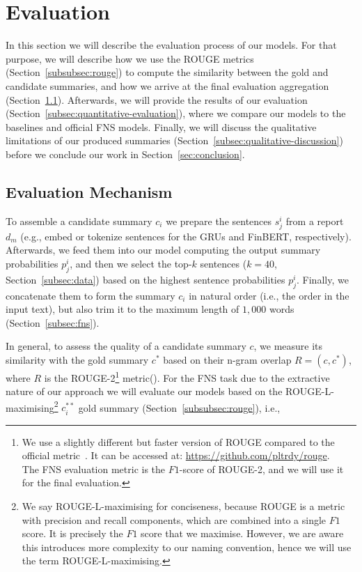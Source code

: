 \section{Evaluation}\label{sec:evaluation}
In this section we will describe the evaluation process of our models.
For that purpose, we will describe how we use the ROUGE metrics (Section~\ref{subsubsec:rouge}) to compute the
similarity between the gold and candidate summaries, and how we arrive at the final evaluation aggregation (Section~\ref{subsec:evaluation-mechanism}).
Afterwards, we will provide the results of our evaluation (Section~\ref{subsec:quantitative-evaluation}), where we compare our models to the baselines and official FNS models.
Finally, we will discuss the qualitative limitations of our produced summaries (Section~\ref{subsec:qualitative-discussion}) before we conclude our work in Section~\ref{sec:conclusion}.

\subsection{Evaluation Mechanism}\label{subsec:evaluation-mechanism}
To assemble a candidate summary $c_{i}$ we prepare the sentences $s_{j}^{i}$ from a report $d_{m}$ (e.g., embed or tokenize sentences for the GRUs and FinBERT, respectively).
Afterwards, we feed them into our model computing the output summary probabilities $p_{j}^{i}$, and then we select the
top-$k$ sentences ($k=40$, Section~\ref{subsec:data}) based on the highest sentence probabilities $p_{j}^{i}$.
Finally, we concatenate them to form the summary $c_{i}$ in natural order (i.e., the order in the input text),
but also trim it to the maximum length of $1,000$ words (Section~\ref{subsec:fns}).

In general, to assess the quality of a candidate summary $c$, we measure its similarity with the gold summary $c^{*}$
based on their n-gram overlap $R=(c, c^{*})$, where $R$ is the ROUGE-2\footnote{
        We use a slightly different but faster version of ROUGE compared to the official metric~\cite{lin2004rouge}.
        It can be accessed at: \url{https://github.com/pltrdy/rouge}. \\
        The FNS evaluation metric is the $F1$-score of ROUGE-2, and we will use it for the final evaluation.
} metric(\cite{lin2004rouge}).
For the FNS task due to the extractive nature of our approach we will evaluate our models based on
the ROUGE-L-maximising\footnote{
    We say ROUGE-L-maximising for conciseness, because ROUGE is a metric with precision and recall components, which are combined into a single $F1$ score.
    It is precisely the $F1$ score that we maximise.
    However, we are aware this introduces more complexity to our naming convention, hence we will use the term ROUGE-L-maximising.
} $c^{**}_{i}$ gold summary (Section~\ref{subsubsec:rouge}), i.e.,

